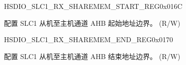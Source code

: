 \begin{register}{H}{SDIO\_SLC1\_RX\_SHAREMEM\_START\_REG}{0x016C}\label{regdesc:SDIOSLC1RXSHAREMEMSTARTREG}
%
\regnewline%
\begin{regdesc}\begin{reglist}
\label{fielddesc:SDIOSDIOSLC1RXSHAREMEMSTARTADDR}\item [SDIO\_SDIO\_SLC1\_RX\_SHAREMEM\_START\_ADDR] 配置 SLC1 从机至主机通道 AHB 起始地址边界。 (R/W)
\end{reglist}\end{regdesc}
\end{register}


\begin{register}{H}{SDIO\_SLC1\_RX\_SHAREMEM\_END\_REG}{0x0170}\label{regdesc:SDIOSLC1RXSHAREMEMENDREG}
%
\regnewline%
\begin{regdesc}\begin{reglist}
\label{fielddesc:SDIOSDIOSLC1RXSHAREMEMENDADDR}\item [SDIO\_SDIO\_SLC1\_RX\_SHAREMEM\_END\_ADDR] 配置 SLC1 从机至主机通道 AHB 结束地址边界。 (R/W)
\end{reglist}\end{regdesc}
\end{register}


